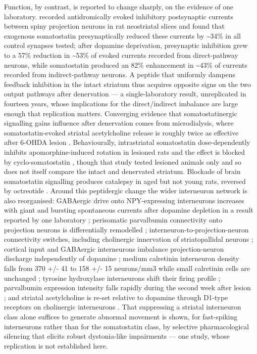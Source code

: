 \documentclass[11pt]{article}
\begin{document}
Function, by contrast, is reported to change sharply, on the evidence of one laboratory. \citet{LopezHuerta2012} recorded antidromically evoked inhibitory postsynaptic currents between spiny projection neurons in rat neostriatal slices and found that exogenous somatostatin presynaptically reduced these currents by \textasciitilde{}34\% in all control synapses tested; after dopamine deprivation, presynaptic inhibition grew to a 57\% reduction in \textasciitilde{}53\% of evoked currents recorded from direct-pathway neurons, while somatostatin produced an 82\% enhancement in \textasciitilde{}43\% of currents recorded from indirect-pathway neurons. A peptide that uniformly dampens feedback inhibition in the intact striatum thus acquires opposite signs on the two output pathways after denervation --- a single-laboratory result, unreplicated in fourteen years, whose implications for the direct/indirect imbalance are large enough that replication matters. Converging evidence that somatostatinergic signalling gains influence after denervation comes from microdialysis, where somatostatin-evoked striatal acetylcholine release is roughly twice as effective after 6-OHDA lesion \citep{Rakovska2003}. Behaviourally, intrastriatal somatostatin dose-dependently inhibits apomorphine-induced rotation in lesioned rats and the effect is blocked by cyclo-somatostatin \citep{Lu2002}, though that study tested lesioned animals only and so does not itself compare the intact and denervated striatum. Blockade of brain somatostatin signalling produces catalepsy in aged but not young rats, reversed by octreotide \citep{Ionov2012}. Around this peptidergic change the wider interneuron network is also reorganised: GABAergic drive onto NPY-expressing interneurons increases with giant and bursting spontaneous currents after dopamine depletion in a result reported by one laboratory \citep{Rubi2020}; perisomatic parvalbumin connectivity onto projection neurons is differentially remodelled \citep{Gomez2019}; interneuron-to-projection-neuron connectivity switches, including cholinergic innervation of striatopallidal neurons \citep{Salin2009}; cortical input and GABAergic interneurons imbalance projection-neuron discharge independently of dopamine \citep{Mallet2006}; medium calretinin interneuron density falls from 370 +/- 41 to 158 +/- 15 neurons/mm3 while small calretinin cells are unchanged \citep{Petryszyn2021}; tyrosine hydroxylase interneurons shift their firing profile \citep{Unal2013}; parvalbumin expression intensity falls rapidly during the second week after lesion \citep{He2024}; and striatal acetylcholine is re-set relative to dopamine through D1-type receptors on cholinergic interneurons \citep{McKinley2019}. That suppressing a striatal interneuron class alone suffices to generate abnormal movement is shown, for fast-spiking interneurons rather than for the somatostatin class, by selective pharmacological silencing that elicits robust dystonia-like impairments \citep{Gittis2011} --- one study, whose replication is not established here.
\end{document}
